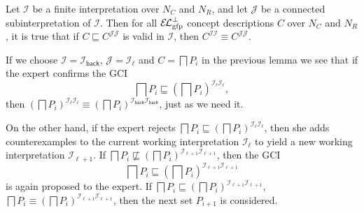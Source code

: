 \begin{Lemma}
  \label{lem:Felix-6.14}
  Let $\mathcal{I}$ be a finite interpretation over $N_{C}$ and $N_{R}$, and let
  $\mathcal{J}$ be a connected subinterpretation of $\mathcal{I}$.  Then for all
  $\ELgfpbot$ concept descriptions $C$ over $N_{C}$ and $N_{R}$, it is true that if $C
  \sqsubseteq C^{\mathcal{J}\mathcal{J}}$ is valid in $\mathcal{I}$, then
  $C^{\mathcal{I}\mathcal{I}} \equiv C^{\mathcal{J}\mathcal{J}}$.
\end{Lemma}

If we choose $\mathcal{I} = \mathcal{I}_{\mathsf{back}}$, $\mathcal{J} =
\mathcal{I}_{\ell}$ and $C = \bigsqcap P_{i}$ in the previous lemma we see that if the
expert confirms the GCI
\begin{equation*}
  \bigsqcap P_{i} \sqsubseteq (\bigsqcap P_{i})^{\mathcal{I}_{\ell}\mathcal{I}_{\ell}},
\end{equation*}
then $(\bigsqcap P_{i})^{\mathcal{I}_{\ell}\mathcal{I}_{\ell}} \equiv (\bigsqcap
P_{i})^{\mathcal{I}_{\mathsf{back}}\mathcal{I}_{\mathsf{back}}}$, just as we need it.

On the other hand, if the expert rejects $\bigsqcap P_{i} \sqsubseteq (\bigsqcap
P_{i})^{\mathcal{I}_{\ell}\mathcal{I}_{\ell}}$, then she adds counterexamples to the
current working interpretation $\mathcal{I}_{\ell}$ to yield a new working interpretation
$\mathcal{I}_{\ell+1}$.  If $\bigsqcap P_{i} \not\sqsubseteq (\bigsqcap
P_{i})^{\mathcal{I}_{\ell+1}\mathcal{I}_{\ell+1}}$, then the GCI
\begin{equation*}
  \bigsqcap P_{i} \sqsubseteq (\bigsqcap P_{i})^{\mathcal{I}_{\ell+1}\mathcal{I}_{\ell+1}}
\end{equation*}
is again proposed to the expert.  If $\bigsqcap P_{i} \sqsubseteq (\bigsqcap
P_{i})^{\mathcal{I}_{\ell+1}\mathcal{I}_{\ell+1}}$, \ie $\bigsqcap P_{i} \equiv (\bigsqcap
P_{i})^{\mathcal{I}_{\ell+1}\mathcal{I}_{\ell+1}}$, then the next set $P_{i+1}$ is
considered.


